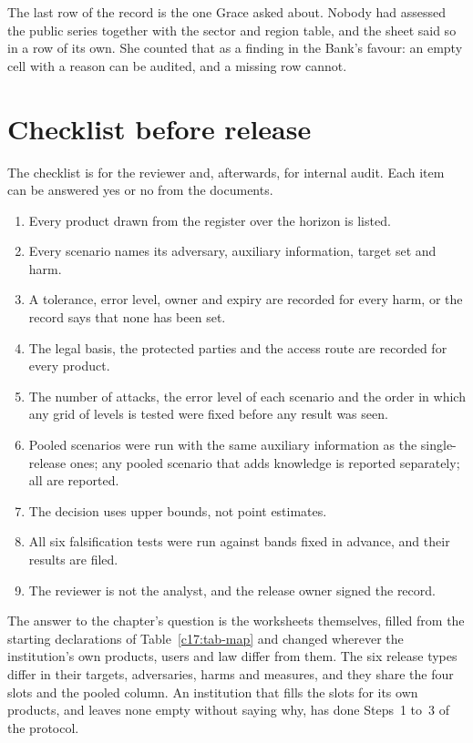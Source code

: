 The last row of the record is the one Grace asked about. Nobody had assessed the public
series together with the sector and region table, and the sheet said so in a row of its
own. She counted that as a finding in the Bank's favour: an empty cell with a reason can
be audited, and a missing row cannot.

\section{Checklist before release}

The checklist is for the reviewer and, afterwards, for internal audit. Each item can
be answered yes or no from the documents.

\begin{enumerate}
\item Every product drawn from the register over the horizon is listed.
\item Every scenario names its adversary, auxiliary information, target set and harm.
\item A tolerance, error level, owner and expiry are recorded for every harm, or the
record says that none has been set.
\item The legal basis, the protected parties and the access route are recorded for
every product.
\item The number of attacks, the error level of each scenario and the order in which
any grid of levels is tested were fixed before any result was seen.
\item Pooled scenarios were run with the same auxiliary information as the
single-release ones; any pooled scenario that adds knowledge is reported separately;
all are reported.
\item The decision uses upper bounds, not point estimates.
\item All six falsification tests were run against bands fixed in advance, and their
results are filed.
\item The reviewer is not the analyst, and the release owner signed the record.
\end{enumerate}

The answer to the chapter's question is the worksheets themselves, filled from the
starting declarations of Table~\ref{c17:tab-map} and changed wherever the
institution's own products, users and law differ from them. The six release types
differ in their targets, adversaries, harms and measures, and they share the four
slots and the pooled column. An institution that fills the slots for its own
products, and leaves none empty without saying why, has done Steps~1 to~3 of the
protocol.


